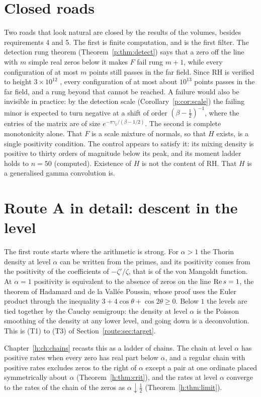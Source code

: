 \section{Closed roads}\label{d:sec:roads}

Two roads that look natural are closed by the results of the volumes, besides requirements 4 and 5. The first is finite computation, and is the first filter. The detection rung theorem (Theorem~\ref{p:thm:detect}) says that a zero off the line with $m$ simple real zeros below it makes $F$ fail rung $m+1$, while every configuration of at most $m$ points still passes in the far field. Since RH is verified to height $3\times10^{12}$ \cite{PT21}, every configuration of at most about $10^{13}$ points passes in the far field, and a rung beyond that cannot be reached. A failure would also be invisible in practice: by the detection scale (Corollary~\ref{p:cor:scale}) the failing minor is expected to turn negative at a shift of order $(\beta-\frac12)^{-1}$, where the entries of the matrix are of size $e^{-\pi\gamma_1/(\beta-1/2)}$.
The second is complete monotonicity alone. That $F$ is a scale mixture of normals, so that $H$ exists, is a single positivity condition. The control appears to satisfy it: its mixing density is positive to thirty orders of magnitude below its peak, and its moment ladder holds to $n=50$ (computed). Existence of $H$ is not the content of RH. That $H$ is a generalised gamma convolution is.

\section{Route A in detail: descent in the level}\label{d:sec:A}

The first route starts where the arithmetic is strong. For $\alpha>1$ the Thorin density at level $\alpha$ can be written from the primes, and its positivity comes from the positivity of the coefficients of $-\zeta'/\zeta$, that is of the von Mangoldt function. At $\alpha=1$ positivity is equivalent to the absence of zeros on the line $\operatorname{Re} s=1$, the theorem of Hadamard and de la Vallée Poussin, whose proof uses the Euler product through the inequality $3+4\cos\theta+\cos2\theta\ge0$. Below $1$ the levels are tied together by the Cauchy semigroup: the density at level $\alpha$ is the Poisson smoothing of the density at any lower level, and going down is a deconvolution. This is (T1) to (T3) of Section~\ref{route:sec:target}.

Chapter~\ref{h:ch:chains} recasts this as a ladder of chains. The chain at level $\alpha$ has positive rates when every zero has real part below $\alpha$, and a regular chain with positive rates excludes zeros to the right of $\alpha$ except a pair at one ordinate placed symmetrically about $\alpha$ (Theorem~\ref{h:thm:crit}), and the rates at level $\alpha$ converge to the rates of the chain of the zeros as $\alpha\downarrow\frac12$ (Theorem~\ref{h:thm:limit}).
